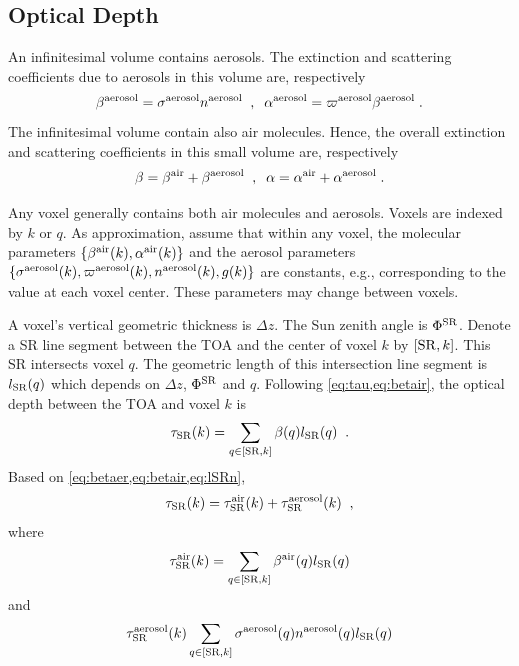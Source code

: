 \documentclass[10pt,letterpaper]{article}
\begin{document}
\subsection{Optical Depth}
\label{sec:optical-depth}

An infinitesimal volume contains aerosols. The extinction and
scattering coefficients due to aerosols in this volume are,
respectively
\begin{equation}
  \beta^{\rm aerosol}=\sigma^{\rm aerosol} n^{\rm aerosol}
  \;\;,\;\;
  \alpha^{\rm aerosol}=\varpi^{\rm aerosol} \beta^{\rm aerosol}
  \;.
  \label{eq:betaer}
\end{equation}
The infinitesimal volume contain also air molecules. Hence, the
overall extinction and scattering coefficients in this small volume
are, respectively
\begin{equation}
  \beta=\beta^{\rm air}+\beta^{\rm aerosol}
  \;\;,\;\;
  \alpha=\alpha^{\rm air}+\alpha^{\rm aerosol}
  \;.
  \label{eq:betair}
\end{equation}

Any voxel generally contains both air molecules and aerosols. Voxels
are indexed by $k$ or $q$. As approximation, assume that within any
voxel, the molecular parameters $\{ \beta^{\rm air}(k),\alpha^{\rm
  air}(k)\}$ and the aerosol parameters $\{ \sigma^{\rm
  aerosol}(k),\varpi^{\rm aerosol}(k), n^{\rm aerosol}(k),g(k)\}$ are
constants, e.g., corresponding to the value at each voxel
center. These parameters may change between voxels.

A voxel's vertical geometric thickness is $\Delta z$.  The Sun zenith
angle is $\Phi^{\rm SR}$. Denote a SR line segment between the TOA and
the center of voxel $k$ by $[{\rm SR},k]$. This SR intersects voxel
$q$. The geometric length of this intersection line segment is $l_{\rm
  SR}(q)$ which depends on $\Delta z$, $\Phi^{\rm SR}$ and $q$.
Following \cref{eq:tau,eq:betair}, the optical depth between the TOA
and voxel $k$ is
\begin{equation}
  \tau_{\rm SR}(k)= \sum_{q \in[{\rm SR},k]} \beta(q) l_{\rm SR}(q) \;\;.
  \label{eq:lSRn}
\end{equation}
Based on \cref{eq:betaer,eq:betair,eq:lSRn},
\begin{equation}
  \tau_{\rm SR}(k)=
  \tau_{\rm SR}^{\rm air}(k) +  \tau_{\rm SR}^{\rm aerosol}(k)
  \;\;,
  \label{eq:lSRaa}
\end{equation}
where
\begin{equation}
  \tau_{\rm SR}^{\rm air}(k)=
  \sum_{q \in[{\rm SR},k]}
  \beta^{\rm air}(q)  l_{\rm SR}(q)
  \label{eq:lSRair}
\end{equation}
and
\begin{equation}
  \tau_{\rm SR}^{\rm aerosol}(k)
  \sum_{q \in[{\rm SR},k]}
  \sigma^{\rm aerosol}(q) n^{\rm aerosol}(q) l_{\rm SR}(q)
  \label{eq:lSRaeros}
\end{equation}
\end{document}
